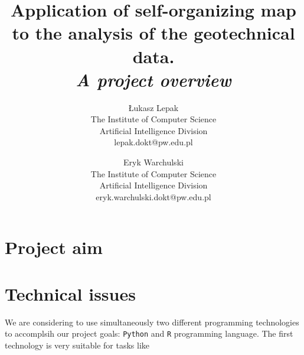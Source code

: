 \documentclass{article}
\title{\textbf{Application of self-organizing map to the analysis of the geotechnical data}.\\ \textit{A project overview}}
\author{%
\begin{tabular}{c} Łukasz Lepak \\ The Institute of Computer Science \\ Artificial Intelligence Division \\ lepak.dokt@pw.edu.pl \end{tabular} \and
\begin{tabular}{c} Eryk Warchulski \\  The Institute of Computer Science \\ Artificial Intelligence Division \\ eryk.warchulski.dokt@pw.edu.pl \end{tabular} 
}
\date{}
\begin{document}
\maketitle

\section{Project aim}
\section{Technical issues}

We are considering to use simultaneously two different programming technologies to accomplsih our project goals: \texttt{Python} and \texttt{R} programming language. The first technology is very suitable for tasks like
\end{document}
